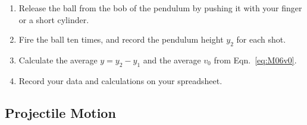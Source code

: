 \begin{enumerate}
\item Release the ball from the bob of the pendulum by pushing it with your finger or a short cylinder.  
\item Fire the ball ten times, and record the %
pendulum height $y_2$ for each shot.
\item Calculate the average $y = y_2-y_1$ and the average $v_0$ from Eqn.~\ref{eq:M06v0}.
\item Record your data and calculations on your spreadsheet.


\end{enumerate}



\subsection{Projectile Motion}

